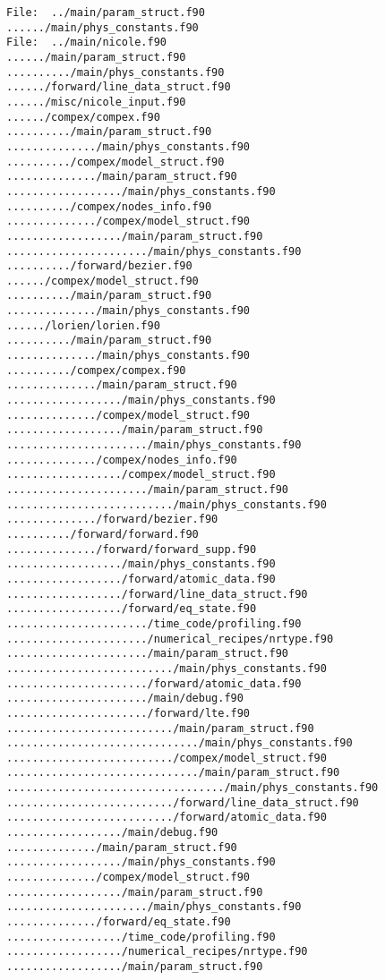 \begin{verbatim}
File:  ../main/param_struct.f90
....../main/phys_constants.f90
File:  ../main/nicole.f90
....../main/param_struct.f90
........../main/phys_constants.f90
....../forward/line_data_struct.f90
....../misc/nicole_input.f90
....../compex/compex.f90
........../main/param_struct.f90
............../main/phys_constants.f90
........../compex/model_struct.f90
............../main/param_struct.f90
................../main/phys_constants.f90
........../compex/nodes_info.f90
............../compex/model_struct.f90
................../main/param_struct.f90
....................../main/phys_constants.f90
........../forward/bezier.f90
....../compex/model_struct.f90
........../main/param_struct.f90
............../main/phys_constants.f90
....../lorien/lorien.f90
........../main/param_struct.f90
............../main/phys_constants.f90
........../compex/compex.f90
............../main/param_struct.f90
................../main/phys_constants.f90
............../compex/model_struct.f90
................../main/param_struct.f90
....................../main/phys_constants.f90
............../compex/nodes_info.f90
................../compex/model_struct.f90
....................../main/param_struct.f90
........................../main/phys_constants.f90
............../forward/bezier.f90
........../forward/forward.f90
............../forward/forward_supp.f90
................../main/phys_constants.f90
................../forward/atomic_data.f90
................../forward/line_data_struct.f90
................../forward/eq_state.f90
....................../time_code/profiling.f90
....................../numerical_recipes/nrtype.f90
....................../main/param_struct.f90
........................../main/phys_constants.f90
....................../forward/atomic_data.f90
....................../main/debug.f90
....................../forward/lte.f90
........................../main/param_struct.f90
............................../main/phys_constants.f90
........................../compex/model_struct.f90
............................../main/param_struct.f90
................................../main/phys_constants.f90
........................../forward/line_data_struct.f90
........................../forward/atomic_data.f90
................../main/debug.f90
............../main/param_struct.f90
................../main/phys_constants.f90
............../compex/model_struct.f90
................../main/param_struct.f90
....................../main/phys_constants.f90
............../forward/eq_state.f90
................../time_code/profiling.f90
................../numerical_recipes/nrtype.f90
................../main/param_struct.f90

\end{verbatim}
